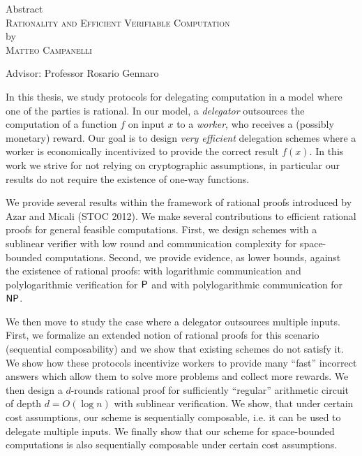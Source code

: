 \begin{center}
Abstract \\
\textsc{Rationality and Efficient Verifiable Computation} \\
by \\
\textsc{Matteo Campanelli} \\[0.25in]
\end{center}

\vspace{0.25in}

\noindent Advisor: Professor Rosario Gennaro

\vspace{0.25in}

	\noindent
In this thesis, we study protocols for delegating computation in a model where one of the parties is rational. In our model, a \textit{delegator} outsources the computation of a function $f$ on input $x$ to a \textit{worker}, who
receives a (possibly monetary) reward. Our goal is to design \textit{very efficient} delegation schemes 
where a worker is economically incentivized to provide the correct result
$f(x)$. In this work we strive for not relying on cryptographic assumptions, in particular our results do not require the existence of one-way functions. 

We provide several results within the framework of rational proofs introduced by Azar and Micali (STOC 2012).
We make several contributions to efficient rational proofs for general feasible computations.
First, we design schemes with a sublinear verifier with low round and communication complexity for
space-bounded computations.
Second, we provide evidence, as lower bounds, against the existence of rational proofs:
with logarithmic communication and polylogarithmic verification for $\P$ and 
with polylogarithmic communication for $\NP$.

We then move to study the case where a delegator outsources multiple inputs.
First, we formalize an extended notion of rational proofs for this scenario (sequential composability) and we
show that existing schemes do not satisfy it. We show how these protocols incentivize workers
to provide many ``fast'' incorrect answers which allow them to solve more problems and collect more rewards.
We then design a $d$-rounds rational proof for sufficiently ``regular'' arithmetic circuit of depth $d = O(\log{n})$
with sublinear verification. We show, that under certain cost assumptions, our scheme is sequentially composable,
i.e. it can be used to delegate multiple inputs. We finally show that our scheme for space-bounded computations is also 
sequentially composable under certain cost assumptions.

